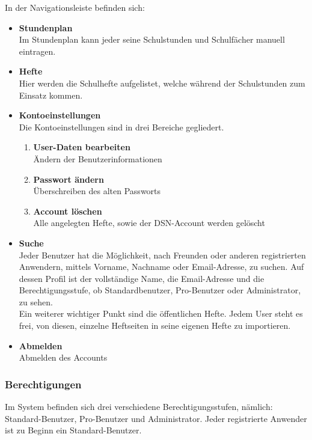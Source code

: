 In der Navigationsleiste befinden sich:
\begin{itemize}
\item \textbf{Stundenplan}\\ Im Stundenplan kann jeder seine Schulstunden und Schulfächer manuell eintragen.
\item \textbf{Hefte}\\ Hier werden die Schulhefte aufgelistet, welche während der Schulstunden zum Einsatz kommen.
\item \textbf{Kontoeinstellungen}\\ Die Kontoeinstellungen sind in drei Bereiche gegliedert.
\begin{enumerate}
\item \textbf{User-Daten bearbeiten}\\ Ändern der Benutzerinformationen
\item \textbf{Passwort ändern}\\ Überschreiben des alten Passworts
\item \textbf{Account löschen}\\ Alle angelegten Hefte, sowie der DSN-Account werden gelöscht
\end{enumerate}
\item \textbf{Suche}\\ Jeder Benutzer hat die Möglichkeit, nach Freunden oder anderen registrierten Anwendern, mittels Vorname, Nachname oder Email-Adresse, zu suchen. Auf dessen Profil ist der vollständige Name, die Email-Adresse und die Berechtigungsstufe, ob Standardbenutzer, Pro-Benutzer oder Administrator, zu sehen.\\
Ein weiterer wichtiger Punkt sind die öffentlichen Hefte. Jedem User steht es frei, von diesen, einzelne Heftseiten in seine eigenen Hefte zu importieren.
\item \textbf{Abmelden}\\ Abmelden des Accounts
\end{itemize}
\newpage 

\subsubsection{Berechtigungen}
Im System befinden sich drei verschiedene Berechtigungsstufen, nämlich: Standard-Benutzer, Pro-Benutzer und Administrator. Jeder registrierte Anwender ist zu Beginn ein Standard-Benutzer.

